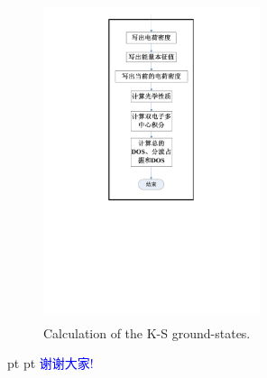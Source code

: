 \documentclass[cjk,slidestop,compress,mathserif,blue]{beamer}
\begin{document}
\frame
{
\frametitle{}
\begin{figure}[h!]
\centering
\vspace*{-0.80in}
\includegraphics[height=3.70in,width=2.5in,viewport=170 300 417 813,clip]{Figures/VASP_main_Flow-4.pdf}
\caption{\small \textrm{Calculation of the K-S ground-states.}}%
\label{VASP_Follow-4}
\end{figure}
}


\logo{}									%
\frame
{
 pt
 pt
\hskip 60pt \textcolor{blue}{\Huge 谢谢大家\:!}
}


\clearpage
\end{document}
